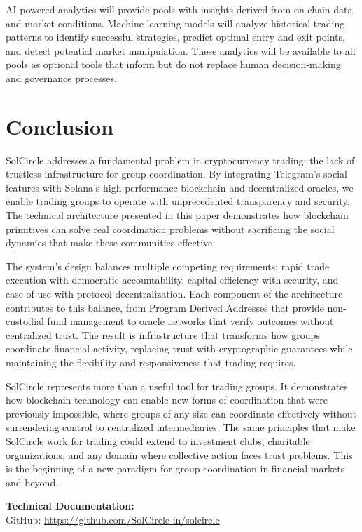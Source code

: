 \documentclass[11pt,a4paper]{article}
\begin{document}
AI-powered analytics will provide pools with insights derived from on-chain data and market conditions. Machine learning models will analyze historical trading patterns to identify successful strategies, predict optimal entry and exit points, and detect potential market manipulation. These analytics will be available to all pools as optional tools that inform but do not replace human decision-making and governance processes.

\section{Conclusion}

SolCircle addresses a fundamental problem in cryptocurrency trading: the lack of trustless infrastructure for group coordination. By integrating Telegram's social features with Solana's high-performance blockchain and decentralized oracles, we enable trading groups to operate with unprecedented transparency and security. The technical architecture presented in this paper demonstrates how blockchain primitives can solve real coordination problems without sacrificing the social dynamics that make these communities effective.

The system's design balances multiple competing requirements: rapid trade execution with democratic accountability, capital efficiency with security, and ease of use with protocol decentralization. Each component of the architecture contributes to this balance, from Program Derived Addresses that provide non-custodial fund management to oracle networks that verify outcomes without centralized trust. The result is infrastructure that transforms how groups coordinate financial activity, replacing trust with cryptographic guarantees while maintaining the flexibility and responsiveness that trading requires.

SolCircle represents more than a useful tool for trading groups. It demonstrates how blockchain technology can enable new forms of coordination that were previously impossible, where groups of any size can coordinate effectively without surrendering control to centralized intermediaries. The same principles that make SolCircle work for trading could extend to investment clubs, charitable organizations, and any domain where collective action faces trust problems. This is the beginning of a new paradigm for group coordination in financial markets and beyond.

\vspace{1cm}

\begin{center}
\textbf{Technical Documentation:} \\
\vspace{0.3cm}
GitHub: \url{https://github.com/SolCircle-in/solcircle} \\
\end{center}
\end{document}
